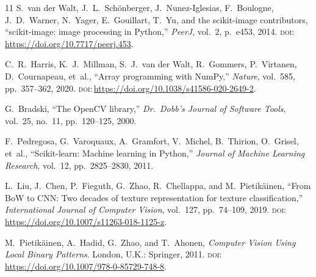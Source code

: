 \documentclass[conference]{IEEEtran}
\providecommand{\doi}[1]{\textsc{doi}:\,\url{https://doi.org/#1}}
\begin{document}
\begin{thebibliography}{11}
S.~van der Walt, J.~L.~Sch\"{o}nberger, J.~Nunez-Iglesias, F.~Boulogne,
J.~D.~Warner, N.~Yager, E.~Gouillart, T.~Yu, and the scikit-image
contributors, ``scikit-image: image processing in Python,'' \emph{PeerJ},
vol.~2, p.~e453, 2014. \doi{10.7717/peerj.453}.

C.~R.~Harris, K.~J.~Millman, S.~J.~van der Walt, R.~Gommers, P.~Virtanen,
D.~Cournapeau, et~al., ``Array programming with NumPy,'' \emph{Nature},
vol.~585, pp.~357--362, 2020. \doi{10.1038/s41586-020-2649-2}.

G.~Bradski, ``The OpenCV library,'' \emph{Dr.\ Dobb's Journal of Software
Tools}, vol.~25, no.~11, pp.~120--125, 2000.

F.~Pedregosa, G.~Varoquaux, A.~Gramfort, V.~Michel, B.~Thirion,
O.~Grisel, et~al., ``Scikit-learn: Machine learning in Python,''
\emph{Journal of Machine Learning Research}, vol.~12, pp.~2825--2830,
2011.

L.~Liu, J.~Chen, P.~Fieguth, G.~Zhao, R.~Chellappa, and M.~Pietik\"{a}inen,
``From BoW to CNN: Two decades of texture representation for texture
classification,'' \emph{International Journal of Computer Vision}, vol.~127,
pp.~74--109, 2019. \doi{10.1007/s11263-018-1125-z}.

M.~Pietik\"{a}inen, A.~Hadid, G.~Zhao, and T.~Ahonen, \emph{Computer Vision
Using Local Binary Patterns}. London, U.K.: Springer, 2011.
\doi{10.1007/978-0-85729-748-8}.
\end{thebibliography}
\end{document}

